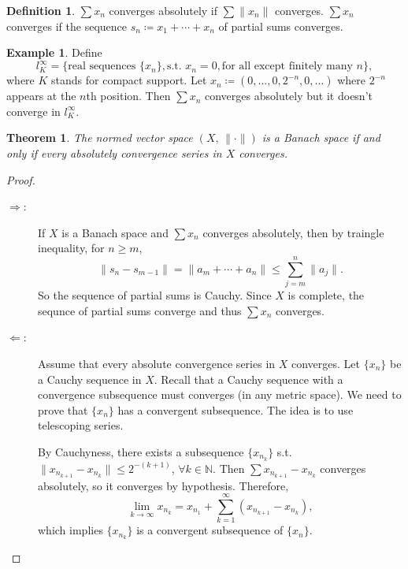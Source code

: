 \documentclass[12pt]{article}
\theoremstyle{plain}
\newtheorem{thm}{Theorem}
\theoremstyle{definition}
\newtheorem*{defn}{Definition}
\newtheorem*{eg}{Example}
\begin{document}
\begin{defn}
    $\sum x_n$ converges absolutely if $\sum \|x_n\|$ converges.
    $\sum x_n$ converges if the sequence $s_n\coloneqq x_1+\cdots + x_n$ of partial sums converges.
\end{defn}
\begin{eg}
    Define
    \[
        l_K^\infty = \{\text{real sequences }\{x_n\}, \text{s.t. }x_n=0, \text{for all except finitely many }n\},
    \]
    where $K$ stands for compact support.
    Let $x_n \coloneqq (0,\ldots,0,2^{-n},0,\ldots)$ where $2^{-n}$ appears at the $n$th position.
    Then $\sum x_n$ converges absolutely but it doesn't converge in $l_K^\infty$.
\end{eg}

\begin{thm}
    The normed vector space $(X,\, \|\cdot\|)$ is a Banach space if and only if every absolutely convergence series in
    $X$ converges.
\end{thm}
\begin{proof}
    \begin{description}
        \item[$\Rightarrow$:]
            If $X$ is a Banach space and $\sum x_n$ converges absolutely, then by traingle inequality, for $n\geq m$,
            \[
                \|s_n - s_{m-1}\|
                = \|a_m + \cdots + a_n\|
                \leq \sum_{j=m}^n \|a_j\|.
            \]
            So the sequence of partial sums is Cauchy.
            Since $X$ is complete, the sequnce of partial sums converge and thus $\sum x_n$ converges.
        \item[$\Leftarrow$:]
            Assume that every absolute convergence series in $X$ converges.
            Let $\{x_n\}$ be a Cauchy sequence in $X$.
            Recall that a Cauchy sequence with a convergence subsequence must converges (in any metric space).
            We need to prove that $\{x_n\}$ has a convergent subsequence.
            The idea is to use telescoping series.

            By Cauchyness, there exists a subsequence $\{x_{n_k}\}$ s.t.\ $\|x_{n_{k+1}} - x_{n_k}\| \leq 2^{-(k+1)}$,
            $\forall k\in \mathbb{N}$.
            Then $\sum x_{n_{k+1}} - x_{n_k}$ converges absolutely, so it converges by hypothesis.
            Therefore, 
            \[
                \lim_{k\rightarrow\infty} x_{n_k} = x_{n_1} + \sum_{k=1}^\infty (x_{n_{k+1}}-x_{n_k}),
            \]
            which implies $\{x_{n_k}\}$ is a convergent subsequence of $\{x_n\}$.
    \end{description}
\end{proof}
\end{document}
